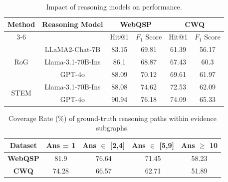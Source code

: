 \documentclass[11pt]{article}
\begin{document}
\begin{table}[t]
\centering
\scriptsize
\renewcommand{\arraystretch}{1.15} %
\setlength{\tabcolsep}{2.5pt} 

\begin{tabular}{c|c|cc|cc}

\hline
\multirow{2}{*}{\textbf{Method}} & \multirow{2}{*}{\textbf{Reasoning Model}} & 
\multicolumn{2}{c|}{\textbf{WebQSP}} & 
\multicolumn{2}{c}{\textbf{CWQ}} \\ \cline{3-6}

 &  &  Hit@1 & $F_1$ Score & Hit@1 & $F_1$ Score \\ 
\hline
\multirow{3}{*}{RoG} & LLaMA2-Chat-7B & 83.15 & 69.81 & 61.39 & 56.17 \\
& Llama-3.1-70B-Ins & 86.1 & 68.87 & 67.43 & 60.3 \\ 
& GPT-4o & 88.09 & 70.12 & 69.61 & 61.97 \\ 
\hline
\multirow{2}{*}{STEM} & Llama-3.1-70B-Ins & 88.08 & 74.62 & 72.53 & 62.09 \\ 
& GPT-4o & 90.94 & 76.18 & 74.09 & 65.33 \\ 

\hline
\end{tabular}
\caption{Impact of reasoning models on performance.}
\label{tab:reason_model}
\end{table}

\begin{table}[t]
\centering
\scriptsize
\renewcommand{\arraystretch}{1.15} %
\setlength{\tabcolsep}{2.5pt} 

\begin{tabular}{c|cccc}

\hline
{\textbf{Dataset}} & {\textbf{Ans} = 1} & {\textbf{Ans} $\in$ [2,4]} & {\textbf{Ans} $\in$ [5,9]} & {\textbf{Ans} $\geq$ 10} \\
\hline
\textbf{WebQSP} & 81.9 & 76.64 & 71.45 & 58.23 \\ 
\hline
\textbf{CWQ} & 74.28 & 66.57 & 62.71 & 51.89 \\
\hline
\end{tabular}
\caption{Coverage Rate (\%) of ground-truth reasoning paths within evidence subgraphs.}
\label{tab:path_cov}
\end{table}
\end{document}
